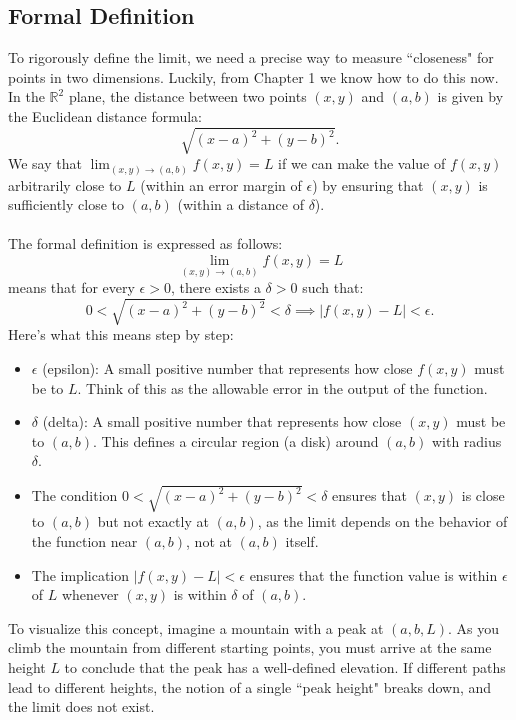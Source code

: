 \subsection*{Formal Definition}
To rigorously define the limit, we need a precise way to measure ``closeness" for points in two dimensions. Luckily, from Chapter 1 we know how to do this now. In the \( \mathbb{R}^2 \) plane, the distance between two points \( (x, y) \) and \( (a, b) \) is given by the Euclidean distance formula:
\[
\sqrt{(x-a)^2 + (y-b)^2}.
\]
We say that \( \lim_{(x, y) \to (a, b)} f(x, y) = L \) if we can make the value of \( f(x, y) \) arbitrarily close to \( L \) (within an error margin of \( \epsilon \)) by ensuring that \( (x, y) \) is sufficiently close to \( (a, b) \) (within a distance of \( \delta \)). \\ \\
The formal definition is expressed as follows:
\[
\lim_{(x, y) \to (a, b)} f(x, y) = L
\]
means that for every \( \epsilon > 0 \), there exists a \( \delta > 0 \) such that:
\[
0 < \sqrt{(x-a)^2 + (y-b)^2} < \delta \implies |f(x, y) - L| < \epsilon.
\]
Here’s what this means step by step:
\begin{itemize}
    \item \( \epsilon \) (epsilon): A small positive number that represents how close \( f(x, y) \) must be to \( L \). Think of this as the allowable error in the output of the function.
    \item \( \delta \) (delta): A small positive number that represents how close \( (x, y) \) must be to \( (a, b) \). This defines a circular region (a disk) around \( (a, b) \) with radius \( \delta \).
    \item The condition \( 0 < \sqrt{(x-a)^2 + (y-b)^2} < \delta \) ensures that \( (x, y) \) is close to \( (a, b) \) but not exactly at \( (a, b) \), as the limit depends on the behavior of the function near \( (a, b) \), not at \( (a, b) \) itself.
    \item The implication \( |f(x, y) - L| < \epsilon \) ensures that the function value is within \( \epsilon \) of \( L \) whenever \( (x, y) \) is within \( \delta \) of \( (a, b) \).
\end{itemize}

\noindent To visualize this concept, imagine a mountain with a peak at \( (a, b, L) \). As you climb the mountain from different starting points, you must arrive at the same height \( L \) to conclude that the peak has a well-defined elevation. If different paths lead to different heights, the notion of a single ``peak height" breaks down, and the limit does not exist. 

